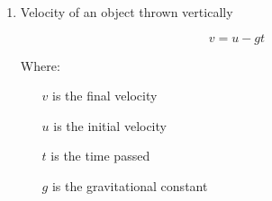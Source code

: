 \begin{enumerate}
\item Velocity of an object thrown vertically

\begin{equation}
v=u-gt
\end{equation}

Where:
\begin{enumerate}
\item[$v$] is the final velocity
\item[$u$] is the initial velocity
\item[$t$] is the time passed
\item[$g$] is the gravitational constant
\end{enumerate}



\end{enumerate}




